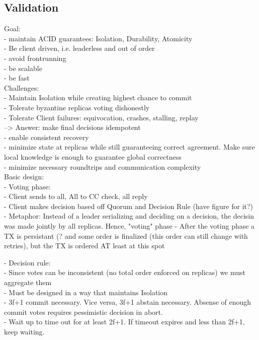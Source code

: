 \subsection{Validation}
Goal:\\
- maintain ACID guarantees: Isolation, Durability, Atomicity\\
- Be client driven, i.e. leaderless and out of order\\
- avoid frontrunning\\
- be scalable\\
- be fast\\


Challenges:\\
- Maintain Isolation while creating highest chance to commit\\
- Tolerate byzantine replicas voting dishonestly\\
- Tolerate Client failures: equivocation, crashes, stalling, replay\\
--> Answer: make final decisions idempotent\\
- enable consistent recovery\\
- minimize state at replicas while still guaranteeing correct agreement. Make sure local knowledge is enough to guarantee global correctness\\
- minimize necessary roundtrips and communication complexity\\


Basic design:\\
- Voting phase:\\
	- Client sends to all, All to CC check, all reply\\
	- Client makes decision based off Quorum and Decision Rule (have figure for it?)\\
	- Metaphor: Instead of a leader serializing and deciding on a decision, the decisin was made jointly by all replicas. Hence, "voting" phase
	- After the voting phase a TX is persistant (?  and some order is finalized (this order can still change with retries), but the TX is ordered AT least at this spot 
	
- Decision rule:\\
	- Since votes can be inconsistent (no total order enforced on replicas) we must aggregate them\\
	- Must be designed in a way that maintains Isolation\\
	- 3f+1 commit necessary. Vice versa, 3f+1 abstain necessary. Absense of enough commit votes requires pessimistic decision in abort.\\
	- Wait up to time out for at least 2f+1. If timeout expires and less than 2f+1, keep waiting. \\
	
